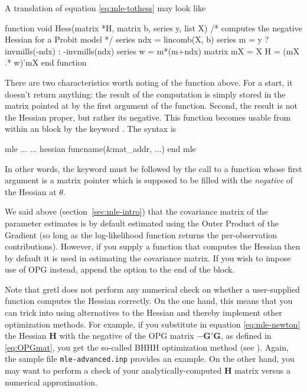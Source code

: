 A  translation of equation \eqref{eq:mle-tothess} may look
like
\begin{code}
function void Hess(matrix *H, matrix b, series y, list X) 
    /* computes the negative Hessian for a Probit model */
    series ndx = lincomb(X, b)
    series m = y ? invmills(-ndx) : -invmills(ndx)
    series w = m*(m+ndx)
    matrix mX = {X}    
    H = (mX .* {w})'mX
end function
\end{code}

There are two characteristics worth noting of the function above. For
a start, it doesn't return anything: the result of the computation is
simply stored in the matrix pointed at by the first argument of the
function. Second, the result is not the Hessian proper, but rather its
negative. This function becomes usable from within an  block
by the keyword . The syntax is
\begin{code}
mle ...
    ...
    hessian funcname(&mat_addr, ...)
end mle
\end{code}
In other words, the  keyword must be followed by the call
to a function whose first argument is a matrix pointer which is
supposed to be filled with the \emph{negative} of the Hessian at
$\theta$.

We said above (section~\ref{sec:mle-intro}) that the covariance matrix
of the parameter estimates is by default estimated using the Outer
Product of the Gradient (so long as the log-likelihood function
returns the per-observation contributions). However, if you supply a
function that computes the Hessian then by default it is used in
estimating the covariance matrix. If you wish to impose use of OPG
instead, append the  option to the end of the 
block.

Note that gretl does not perform any numerical check on whether a
user-supplied function computes the Hessian correctly. On the one
hand, this means that you can trick  into using alternatives
to the Hessian and thereby implement other optimization methods. For
example, if you substitute in equation \ref{eq:mle-newton} the Hessian
$\mathbf{H}$ with the negative of the OPG matrix
$-\mathbf{G}'\mathbf{G}$, as defined in \eqref{eq:OPGmat}, you get the
so-called BHHH optimization method (see \cite{bhhh74}). Again, the
sample file \verb|mle-advanced.inp| provides an example. On the other
hand, you may want to perform a check of your analytically-computed
$\mathbf{H}$ matrix versus a numerical approximation.

